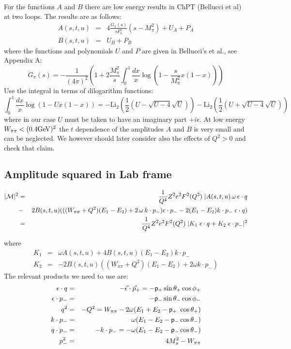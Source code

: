 \documentclass[12pt,epsfig]{article}
\newcommand{\beq}{\begin{equation}}
\newcommand{\eeq}{\end{equation}}
\newcommand{\bea}{\begin{eqnarray}}
\newcommand{\eea}{\end{eqnarray}}
\newcommand{\eps}{\epsilon}
\begin{document}
For the functions $A$ and  $B$ there are low energy results in ChPT (Bellucci et al) at two loops. The results are as follows:
\bea
A(s,t,u)&=& 4\frac{ G_\pi(s)}{s F_\pi^2}(s-M_\pi^2)+U_A+P_A\nonumber\\
 B(s,t,u)&=& U_B+P_B
\eea
where the functions and polynomials $U$ and $P$ are given in Bellucci's et al., see Appendix A:
\beq
G_\pi(s)=-\frac{1}{(4\pi)^2}\left (1+2\frac{M_\pi^2}{s}\int_0^1 \frac{dx}{x} \log(1-\frac{s}{M_\pi^2} x(1-x))\right)
\eeq
Use the integral in terms of dilogarithm functions:
\beq
\int_{0}^1 \frac{dx}{x} \log(1-U x(1-x))=-\text{Li}_2\left(\frac{1}{2} \left(U-\sqrt{U-4} \sqrt{U}\right)\right)-\text{Li}_2\left(\frac{1}{2} \left(U+\sqrt{U-4} \sqrt{U}\right)\right)\eeq
where in our case $U$ must be taken to have an imaginary part $+i\eps$.
At low energy $W_{\pi\pi}< (0.4 {\rm GeV})^2$ the $t$ dependence of the amplitudes $A$ and  $B$ is very small and can be neglected. We however should later consider also the effects of $Q^2>0$ and check that claim. 

\subsection{Amplitude squared in Lab frame}

 \bea
 \arrowvert {\cal{M}}\arrowvert^2&=&\frac{1}{Q^4} Z^2 e^2 F^2(Q^2)\; \arrowvert  A(s,t,u)\, \omega\, \eps\cdot   q \nonumber\\
 &-& 2 B(s,t,u)(( (W_{\pi\pi}+Q^2) (E_1-E_2) +2\, \omega \, k\cdot p_- )  \eps\cdot  p_--2 (E_1-E_2) k\cdot p_- \; \eps\cdot   q)   \nonumber \\
 &=&\frac{1}{Q^4} Z^2 e^2 F^2(Q^2)\; \arrowvert K_1\;  \eps \cdot   q+K_2\;   \eps \cdot   p_-\arrowvert^2
\eea

where
\bea
K_1&=&\omega A(s,t,u)+4 B(s,t,u) (E_1-E_2) k\cdot p_-\nonumber\\
K_2&=& -2 B(s,t,u)((W_{\pi\pi}+Q^2)(E_1-E_2) +2\omega k\cdot p_-)
\eea
The relevant products we need to use are:
\bea
\eps \cdot q&=&-\vec \eps \cdot \vec p_+=-{\sf{p}_+}\sin\theta_+ \cos\phi_+\nonumber\\
\eps\cdot p_-&=&-{\sf{p}_-}\sin\theta_- \cos\phi_-\nonumber\\
q^2&=&-Q^2=W_{\pi\pi}-2\omega(E_1+E_2-{\sf{p}_+}\ \cos\theta_+)\nonumber\\
k\cdot p_-&=& \omega(E_1-E_2-{\sf{p}_-}\cos\theta_-)\nonumber\\
q\cdot p_-&=&-k\cdot p_-= -\omega(E_1-E_2-{\sf{p}_-}\cos\theta_-)\nonumber\\
p_-^2&=&4 M_\pi^2-W_{\pi\pi}
\eea
\end{document}
